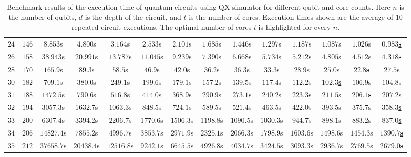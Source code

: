 \begin{table}
{\begin{tabular}{cccccccccccccc}
            $24$ & $146$ & $8.853$s & $4.800$s & $3.164$s & $2.533$s & $2.101$s & $1.685$s & $1.446$s & $1.297$s & $1.187$s & $1.087$s & $1.026$s & \underline{$\mathbf{0.983}$\textbf{s}} \\
            $26$ & $158$ & $38.943$s & $20.991$s & $13.787$s & $11.045$s & $9.239$s & $7.390$s & $6.668$s & $5.734$s & $5.212$s & $4.805$s & $4.512$s & \underline{$\mathbf{4.318}$\textbf{s}} \\
            $28$ & $170$ & $165.9$s & $89.3$s & $58.5$s & $46.9$s & $42.0$s & $36.2$s & $36.3$s & $33.3$s & $28.9$s & $25.0$s & \underline{$\mathbf{22.8}$\textbf{s}} & $27.5$s \\
            $30$ & $182$ & $709.1$s & $380.0$s & $249.1$s & $199.6$s & $179.1$s & $157.2$s & $139.5$s & $117.4$s & $112.2$s & \underline{$\mathbf{102.3}$\textbf{s}} & $106.9$s & $104.8$s \\
            $31$ & $188$ & $1472.5$s & $790.6$s & $516.8$s & $414.0$s & $368.9$s & $290.9$s & $273.1$s & $240.2$s & $223.3$s & $211.5$s & \underline{$\mathbf{206.1}$\textbf{s}} & $207.2$s \\
            $32$ & $194$ & $3057.3$s & $1632.7$s & $1063.3$s & $848.5$s & $724.1$s & $589.5$s & $521.4$s & $463.5$s & $422.0$s & $393.5$s & $375.7$s & \underline{$\mathbf{358.3}$\textbf{s}} \\
            $33$ & $200$ & $6307.4$s & $3394.2$s & $2206.7$s & $1770.6$s & $1506.3$s & $1198.8$s & $1090.5$s & $1030.3$s & $944.7$s & $898.1$s & $883.2$s & \underline{$\mathbf{837.0}$\textbf{s}} \\
            $34$ & $206$ & $14827.4$s & $7855.2$s & $4996.7$s & $3853.7$s & $2971.9$s & $2325.1$s & $2066.3$s & $1798.9$s & $1603.6$s & $1498.6$s & $1454.3$s & \underline{$\mathbf{1390.7}$\textbf{s}} \\
            $35$ & $212$ & $37658.7$s & $20438.4$s & $12516.8$s & $9242.1$s & $6645.5$s & $4926.8$s & $4034.7$s & $3424.5$s & $3093.3$s & $2936.7$s & $2769.5$s & \underline{$\mathbf{2679.0}$\textbf{s}} \\
        \end{tabular}
    }
    \caption[Benchmark results of the execution time of quantum circuits using QX simulator for different qubit and core counts.]{
        Benchmark results of the execution time of quantum circuits using QX simulator for different qubit and core counts.
        Here $n$ is the number of qubits, $d$ is the depth of the circuit, and $t$ is the number of cores.
        Execution times shown are the average of 10 repeated circuit executions.
        The optimal number of cores $t$ is highlighted for every $n$.
    }
    \label{table:qx-benchmark}
\end{table}

